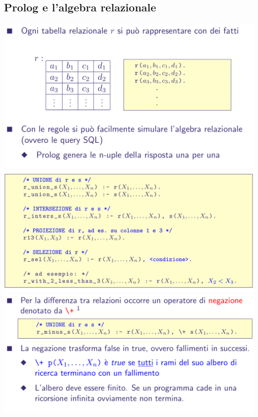 \documentclass[10pt]{article}
\begin{document}
\subsection{Prolog e l'algebra relazionale}
\includegraphics[scale=0.25]{Immagini/pl31.png}
\\
\includegraphics[scale=0.25]{Immagini/pl32.png}
\\
\includegraphics[scale=0.25]{Immagini/pl33.png}
\end{document}
